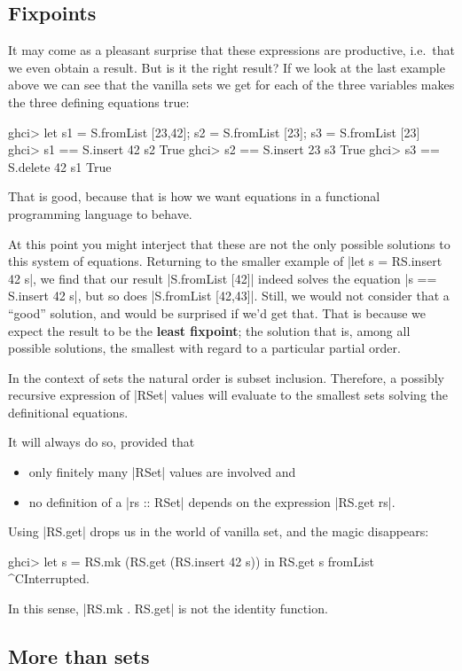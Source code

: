 \documentclass[manuscript,anonymous,screen,acmsmall]{acmart}
\begin{document}
\subsection{Fixpoints}

It may come as a pleasant surprise that these expressions are productive, i.e.\ that we even obtain a result. But is it the right result? If we look at the last example above we can see that the vanilla sets we get for each of the three variables makes the three defining equations true:
\begin{code}
ghci> let s1 = S.fromList [23,42]; s2 = S.fromList [23]; s3 = S.fromList [23]
ghci> s1 == S.insert 42 s2
True
ghci> s2 == S.insert 23 s3
True
ghci> s3 == S.delete 42 s1
True
\end{code}

That is good, because that is how we want equations in a functional programming language to behave.

At this point you might interject that these are not the only possible solutions to this system of equations. Returning to the smaller example of |let s = RS.insert 42 s|, we find that our result |S.fromList [42]| indeed solves the equation |s == S.insert 42 s|, but so does |S.fromList [42,43]|. Still, we would not consider that a “good” solution, and would be surprised if we'd get that.
%
That is because we expect the result to be the \textbf{least fixpoint}; the solution that is, among all possible solutions, the smallest with regard to a particular partial order.

In the context of sets the natural order is subset inclusion. Therefore, a possibly recursive expression of |RSet| values will evaluate to the smallest sets solving the definitional equations.

It will always do so, provided that
\begin{itemize}
\item only finitely many |RSet| values are involved and
\item no definition of a |rs :: RSet| depends on the expression |RS.get rs|.
\end{itemize}
Using |RS.get| drops us in the world of vanilla set, and the magic disappears:
\begin{code}
ghci> let s = RS.mk (RS.get (RS.insert 42 s)) in RS.get s
fromList ^CInterrupted.
\end{code}
In this sense, |RS.mk . RS.get| is not the identity function.

\subsection{More than sets}
\end{document}
